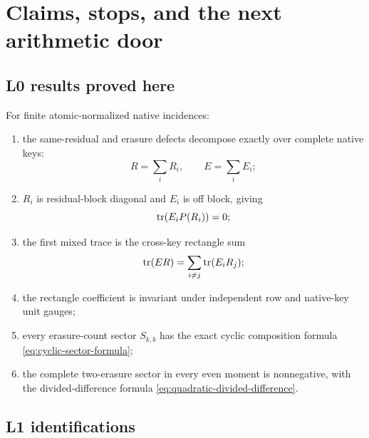 \section{Claims, stops, and the next arithmetic door}
\label{sec:claim-boundary}

\subsection{L0 results proved here}

For finite atomic-normalized native incidences:
\begin{enumerate}[label=\textup{(\arabic*)},leftmargin=3em]
 \item the same-residual and erasure defects decompose exactly over complete
       native keys:
       \[
       R=\sum_iR_i,\qquad E=\sum_iE_i;
       \]
 \item \(R_i\) is residual-block diagonal and \(E_i\) is off block, giving
       \[
       \operatorname{tr}(E_iP(R_i))=0;
       \]
 \item the first mixed trace is the cross-key rectangle sum
       \[
       \operatorname{tr}(ER)=\sum_{i\ne j}\operatorname{tr}(E_iR_j);
       \]
 \item the rectangle coefficient is invariant under independent row and
       native-key unit gauges;
 \item every erasure-count sector \(S_{k,b}\) has the exact cyclic
       composition formula \eqref{eq:cyclic-sector-formula};
 \item the complete two-erasure sector in every even moment is nonnegative,
       with the divided-difference formula
       \eqref{eq:quadratic-divided-difference}.
\end{enumerate}

\subsection{L1 identifications}

